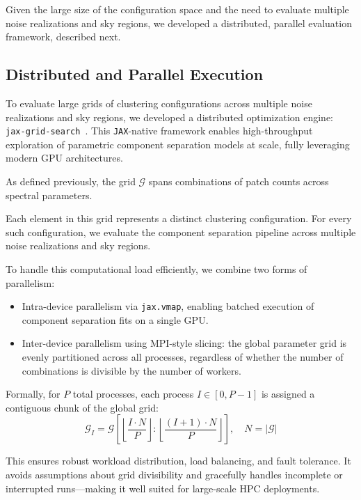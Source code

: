 \documentclass[fleqn,usenatbib]{mnras}
\begin{document}
Given the large size of the configuration space and the need to evaluate multiple noise realizations and sky regions, we developed a distributed, parallel evaluation framework, described next.


\subsection{Distributed and Parallel Execution}
\label{subsec:parallel_grid_search}

To evaluate large grids of clustering configurations across multiple noise realizations and sky regions, we developed a distributed optimization engine: \texttt{jax-grid-search}~\citep{kabalan2025jaxgridsearch}. This \texttt{JAX}-native framework enables high-throughput exploration of parametric component separation models at scale, fully leveraging modern GPU architectures.

As defined previously, the grid \( \mathcal{G} \) spans combinations of patch counts across spectral parameters. 

Each element in this grid represents a distinct clustering configuration. For every such configuration, we evaluate the component separation pipeline across multiple noise realizations and sky regions.

To handle this computational load efficiently, we combine two forms of parallelism:
\begin{itemize}
    \item Intra-device parallelism via \texttt{jax.vmap}, enabling batched execution of component separation fits on a single GPU.
    \item Inter-device parallelism using MPI-style slicing: the global parameter grid is evenly partitioned across all processes, regardless of whether the number of combinations is divisible by the number of workers.
\end{itemize}

Formally, for \( P \) total processes, each process \( I \in [0, P-1] \) is assigned a contiguous chunk of the global grid:
\[
\mathcal{G}_I = \mathcal{G} \left[ \left\lfloor \frac{I \cdot N}{P} \right\rfloor : \left\lfloor \frac{(I+1) \cdot N}{P} \right\rfloor \right], \quad N = |\mathcal{G}|
\]

This ensures robust workload distribution, load balancing, and fault tolerance. It avoids assumptions about grid divisibility and gracefully handles incomplete or interrupted runs—making it well suited for large-scale HPC deployments.
\end{document}
